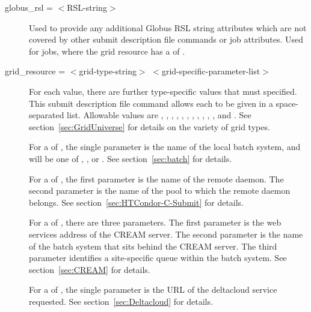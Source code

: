 \begin{description}

\label{condor-submit-globus-rsl}
\item[globus\_rsl = $<$RSL-string$>$]
Used to provide any additional Globus RSL
string attributes which are not covered by other submit description
file commands or job attributes. Used for  
jobs, where the grid resource has a  of
.

\label{condor-submit-grid-resource}
\item[grid\_resource = $<$grid-type-string$>$ $<$grid-specific-parameter-list$>$ ]
For each  value, 
there are further type-specific values that must specified.
This submit description file command allows each to
be given in a space-separated list.
Allowable  values are
, 
, , 
, 
,
, ,
, , ,
,
and .
See section~\ref{sec:GridUniverse} for details on the variety of 
grid types.

For a  of ,
the single parameter is the name of the local batch system,
and will be one of , , or .
See section~\ref{sec:batch} for details.

For a  of ,
the first parameter is the name of the remote 
daemon.
The second parameter is the name of the pool to which the remote
 daemon belongs.
See section~\ref{sec:HTCondor-C-Submit} for details.

For a  of ,
there are three parameters.
The first parameter is the web services address of the CREAM server.
The second parameter is the 
name of the batch system that sits behind the CREAM server.
The third parameter identifies a site-specific queue
within the batch system.
See section~\ref{sec:CREAM} for details.

For a  of ,
the single parameter is the URL of the deltacloud service requested.
See section~\ref{sec:Deltacloud} for details.


\end{description}
